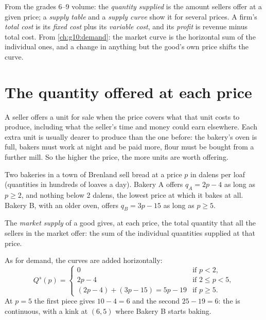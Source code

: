 \begin{recall}
From the grades 6--9 volume: the \emph{quantity supplied} is the amount sellers offer at a given price; a \emph{supply
table} and a \emph{supply curve} show it for several prices. A firm's \emph{total cost} is its \emph{fixed cost} plus its
\emph{variable cost}, and its \emph{profit} is revenue minus total cost. From \cref{ch:g10:demand}: the market curve is the
horizontal sum of the individual ones, and a change in anything but the good's own price shifts the curve.
\end{recall}

\section{The quantity offered at each price}\label{sec:g10:supply:offered}

A seller offers a unit for sale when the price covers what that unit costs to produce, including what the seller's time and
money could earn elsewhere. Each extra unit is usually dearer to produce than the one before: the bakery's oven is full,
bakers must work at night and be paid more, flour must be bought from a further mill. So the higher the price, the more
units are worth offering.

Two bakeries in a town of Brenland sell bread at a price $p$ in dalens per loaf (quantities in hundreds of loaves a day).
Bakery A offers $q_A = 2p - 4$ as long as $p \ge 2$, and nothing below 2 dalens, the lowest price at which it bakes at all.
Bakery B, with an older oven, offers $q_B = 3p - 15$ as long as $p \ge 5$.

\begin{definition}\label{def:g10:supply:market-supply}
The \emph{market supply} of a good gives, at each price, the total quantity that all the sellers in
the market offer: the sum of the individual quantities supplied at that price.
\end{definition}

As for demand, the curves are added horizontally:
\[
  Q^s(p) = \begin{cases} 0 & \text{if } p < 2, \\ 2p - 4 & \text{if } 2 \le p < 5, \\ (2p - 4) + (3p - 15) = 5p - 19 &
  \text{if } p \ge 5 . \end{cases}
\]
At $p = 5$ the first piece gives $10 - 4 = 6$ and the second $25 - 19 = 6$: the  is continuous, with a kink at
$(6, 5)$ where Bakery B starts baking.

